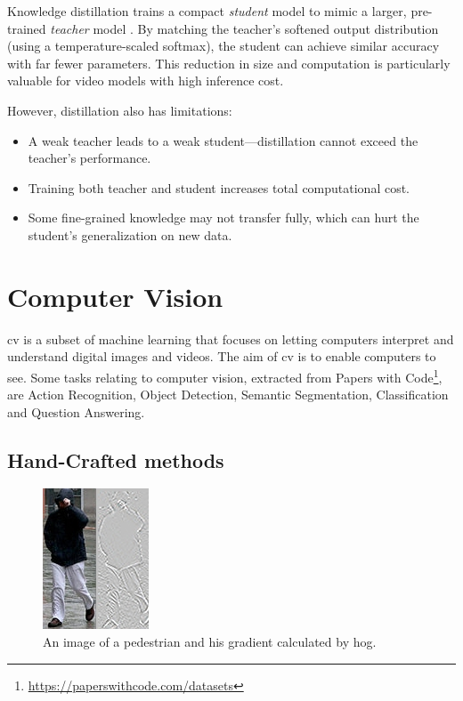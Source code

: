 Knowledge distillation trains a compact \emph{student} model to mimic a larger, pre-trained \emph{teacher} model \cite{denize_comedian_2024, li_videomamba_2024, bose_soccerkdnet_2023}. By matching the teacher’s softened output distribution (using a temperature-scaled softmax), the student can achieve similar accuracy with far fewer parameters. This reduction in size and computation is particularly valuable for video models with high inference cost.

However, distillation also has limitations:
\begin{itemize}
    \item A weak teacher leads to a weak student—distillation cannot exceed the teacher’s performance.
    \item Training both teacher and student increases total computational cost.
    \item Some fine-grained knowledge may not transfer fully, which can hurt the student’s generalization on new data.
\end{itemize}


\section{Computer Vision} 
\label{sec:computer_vision}

\acrfull{cv} is a subset of machine learning that focuses on letting computers interpret and understand digital images and videos. The aim of \acrlong{cv} is to enable computers to see. Some tasks relating to computer vision, extracted from Papers with Code\footnote{\url{https://paperswithcode.com/datasets}}, are Action Recognition, Object Detection, Semantic Segmentation, Classification and Question Answering. 

\subsection{Hand-Crafted methods}

\begin{figure}
    \centering
    \includegraphics[width=0.5\linewidth]{figures/Pedestrian_gradient.jpg}
    \caption{An image of a pedestrian and his gradient calculated by \acrshort{hog}.}
    \label{fig:pedestrian_gradient}
\end{figure}


